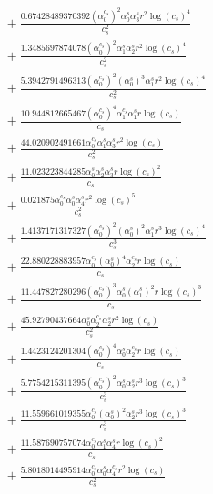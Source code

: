 \documentclass[10pt]{article}
\begin{document}
\begin{align*}
&{}  + \frac{0.67428489370392 \left(\alpha_{0}^{c_s}\right)^{2} \alpha_{0}^s \alpha_{3}^s r^{2} \log{\left(c_{s} \right)}^{4}}{c_{s}^{2}} \\
&{}  + \frac{1.3485697874078 \left(\alpha_{0}^{c_s}\right)^{2} \alpha_{1}^s \alpha_{2}^s r^{2} \log{\left(c_{s} \right)}^{4}}{c_{s}^{2}} \\
&{}  + \frac{5.3942791496313 \left(\alpha_{0}^{c_s}\right)^{2} \left(\alpha_{0}^s\right)^{3} \alpha_{1}^s r^{2} \log{\left(c_{s} \right)}^{4}}{c_{s}^{2}} \\
&{}  + \frac{10.944812665467 \left(\alpha_{0}^{c_s}\right)^{4} \alpha_{1}^{c_s} \alpha_{1}^s r \log{\left(c_{s} \right)}}{c_{s}} \\
&{}  + \frac{44.020902491661 \alpha_{0}^{c_s} \alpha_{1}^s \alpha_{3}^s r^{2} \log{\left(c_{s} \right)}}{c_{s}^{2}} \\
&{}  + \frac{11.023223844285 \alpha_{0}^s \alpha_{2}^s \alpha_{3}^s r \log{\left(c_{s} \right)}^{2}}{c_{s}} \\
&{}  + \frac{0.021875 \alpha_{0}^{c_s} \alpha_{0}^s \alpha_{4}^s r^{2} \log{\left(c_{s} \right)}^{5}}{c_{s}^{2}} \\
&{}  + \frac{1.4137171317327 \left(\alpha_{0}^{c_s}\right)^{2} \left(\alpha_{0}^s\right)^{2} \alpha_{1}^s r^{3} \log{\left(c_{s} \right)}^{4}}{c_{s}^{3}} \\
&{}  + \frac{22.880228883957 \alpha_{0}^{c_s} \left(\alpha_{0}^s\right)^{4} \alpha_{2}^{c_s} r \log{\left(c_{s} \right)}}{c_{s}} \\
&{}  + \frac{11.447827280296 \left(\alpha_{0}^{c_s}\right)^{3} \alpha_{0}^s \left(\alpha_{1}^s\right)^{2} r \log{\left(c_{s} \right)}^{3}}{c_{s}} \\
&{}  + \frac{45.92790437664 \alpha_{0}^s \alpha_{2}^{c_s} \alpha_{2}^s r^{2} \log{\left(c_{s} \right)}}{c_{s}^{2}} \\
&{}  + \frac{1.4423124201304 \left(\alpha_{0}^{c_s}\right)^{4} \alpha_{0}^s \alpha_{2}^{c_s} r \log{\left(c_{s} \right)}}{c_{s}} \\
&{}  + \frac{5.7754215311395 \left(\alpha_{0}^{c_s}\right)^{2} \alpha_{0}^s \alpha_{2}^s r^{3} \log{\left(c_{s} \right)}^{3}}{c_{s}^{3}} \\
&{}  + \frac{11.559661019355 \alpha_{0}^{c_s} \left(\alpha_{0}^s\right)^{2} \alpha_{2}^s r^{3} \log{\left(c_{s} \right)}^{3}}{c_{s}^{3}} \\
&{}  + \frac{11.587690757074 \alpha_{0}^{c_s} \alpha_{1}^s \alpha_{4}^s r \log{\left(c_{s} \right)}^{2}}{c_{s}} \\
&{}  + \frac{5.8018014495914 \alpha_{0}^{c_s} \alpha_{0}^s \alpha_{4}^{c_s} r^{2} \log{\left(c_{s} \right)}}{c_{s}^{2}} \\

\end{align*}
\end{document}
